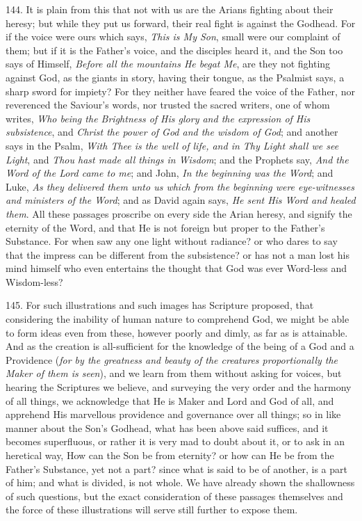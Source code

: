 144. It is plain from this
that not with us are the Arians fighting about their heresy; but while
they put us forward, their real fight is against the Godhead. For if
the voice were ours which says, \emph{This is My Son}, small were our
complaint of them; but if it is the Father's voice, and the disciples
heard it, and the Son too says of Himself, \emph{Before all the mountains
He begat Me}, are they not fighting against God, as the giants in
story, having their tongue, as the Psalmist says, a sharp sword for
impiety? For they neither have feared the voice of the Father, nor
reverenced the Saviour's words, nor trusted the sacred writers, one of
whom writes, \emph{Who being the Brightness of His glory and the
expression of His subsistence}, and \emph{Christ the power of God and
the wisdom of God}; and another says in the Psalm, \emph{With Thee is
the well of life, and in Thy Light shall we see Light}, and \emph{Thou
hast made all things in Wisdom}; and the Prophets say, \emph{And the
Word of the Lord came to me}; and John, \emph{In the beginning was the
Word}; and Luke, \emph{As they delivered them unto us which from the
beginning were eye-witnesses and ministers of the Word}; and as
David again says, \emph{He sent His Word and healed them}. All these
passages proscribe on every side the Arian heresy, and signify the
eternity of the Word, and that He is not foreign but proper to the
Father's Substance. For when saw any one light without radiance? or
who dares to say that the impress can be different from the
subsistence? or has not a man lost his mind himself who even
entertains the thought that God was ever Word-less and Wisdom-less?

145. For such illustrations
and such images has Scripture proposed, that considering the inability
of human nature to comprehend God, we might be able to form ideas even
from these, however poorly and dimly, as far as is attainable. And as
the creation is all-sufficient for the knowledge of the being of a God
and a Providence (\emph{for by the greatness and beauty of the creatures
proportionally the Maker of them is seen}), and we learn from them
without asking for voices, but hearing the Scriptures we believe, and
surveying the very order and the harmony of all things, we acknowledge
that He is Maker and Lord and God of all, and apprehend His marvellous
providence and governance over all things; so in like manner about the
Son's Godhead, what has been above said suffices, and it becomes
superfluous, or rather it is very mad to doubt about it, or to ask in
an heretical way, How can the Son be from eternity? or how can He be
from the Father's Substance, yet not a part? since what is said to be
of another, is a part of him; and what is divided, is not whole. We
have already shown the shallowness of such questions, but the exact
consideration of these passages themselves and the force of these
illustrations will serve still further to expose them.

